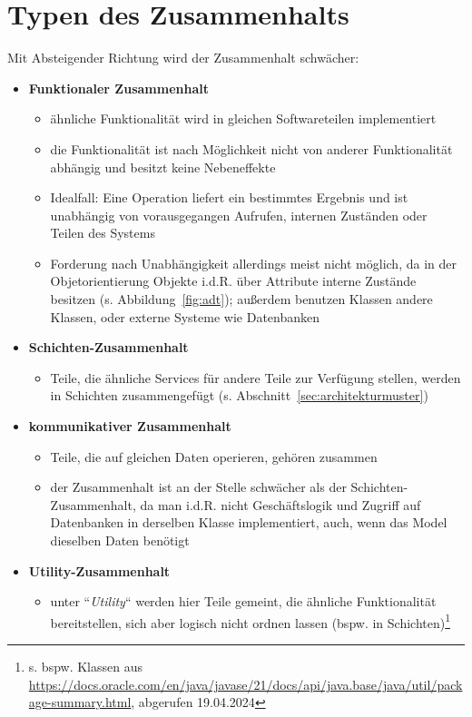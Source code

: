 \section{Typen des Zusammenhalts}


\begin{tcolorbox}[title=Typen des Zusammenhalts]

    Mit Absteigender Richtung wird der Zusammenhalt schwächer:

\begin{itemize}
    \item \textbf{Funktionaler Zusammenhalt}
    \begin{itemize}
        \item ähnliche Funktionalität wird in gleichen Softwareteilen implementiert
        \item die Funktionalität ist nach Möglichkeit nicht von anderer Funktionalität abhängig und besitzt keine Nebeneffekte
        \item Idealfall: Eine Operation liefert ein bestimmtes Ergebnis und ist unabhängig von vorausgegangen Aufrufen, internen Zuständen oder Teilen des Systems
        \item Forderung nach Unabhängigkeit allerdings meist nicht möglich, da in der Objetorientierung Objekte i.d.R. über Attribute interne Zustände besitzen (s. Abbildung~\ref{fig:adt}); außerdem benutzen Klassen andere Klassen, oder externe Systeme wie Datenbanken
    \end{itemize}

    \item \textbf{Schichten-Zusammenhalt}
    \begin{itemize}
        \item Teile, die ähnliche Services für andere Teile zur Verfügung stellen, werden in Schichten zusammengefügt (s. Abschnitt~\ref{sec:architekturmuster})
    \end{itemize}
    \item \textbf{kommunikativer Zusammenhalt}
    \begin{itemize}
        \item Teile, die auf gleichen Daten operieren, gehören zusammen
        \item der Zusammenhalt ist an der Stelle schwächer als der Schichten-Zusammenhalt, da man i.d.R. nicht Geschäftslogik und Zugriff auf Datenbanken in derselben Klasse implementiert, auch, wenn das Model dieselben Daten benötigt
    \end{itemize}
    \item \textbf{Utility-Zusammenhalt}
    \begin{itemize}
        \item unter ``\textit{Utility}`` werden hier Teile gemeint, die ähnliche Funktionalität bereitstellen, sich aber logisch nicht ordnen lassen (bspw. in Schichten)\footnote{s. bspw. Klassen aus \url{https://docs.oracle.com/en/java/javase/21/docs/api/java.base/java/util/package-summary.html}, abgerufen 19.04.2024}
    \end{itemize}
\end{itemize}
    \end{tcolorbox}